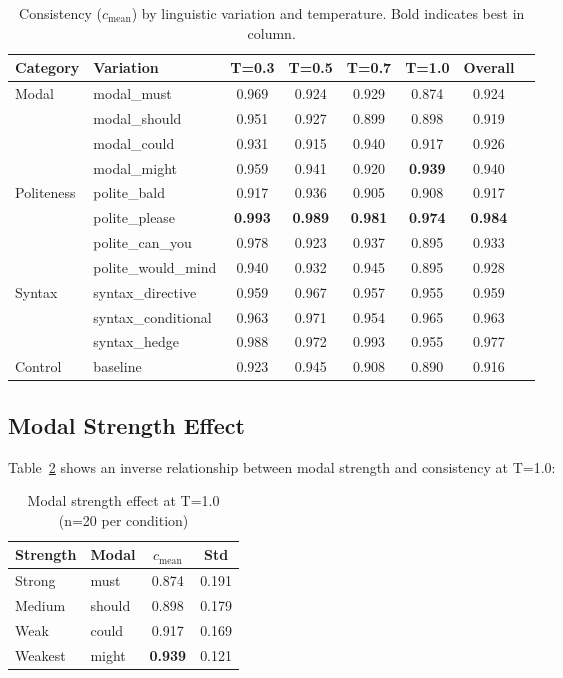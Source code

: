 \documentclass[11pt]{article}
\begin{document}
\begin{table}[t]
\centering
\begin{tabular}{llcccccc}
\toprule
Category & Variation & T=0.3 & T=0.5 & T=0.7 & T=1.0 & Overall \\
\midrule
\multirow{4}{*}{Modal}
& modal\_must & 0.969 & 0.924 & 0.929 & 0.874 & 0.924 \\
& modal\_should & 0.951 & 0.927 & 0.899 & 0.898 & 0.919 \\
& modal\_could & 0.931 & 0.915 & 0.940 & 0.917 & 0.926 \\
& modal\_might & 0.959 & 0.941 & 0.920 & \textbf{0.939} & 0.940 \\
\midrule
\multirow{4}{*}{Politeness}
& polite\_bald & 0.917 & 0.936 & 0.905 & 0.908 & 0.917 \\
& polite\_please & \textbf{0.993} & \textbf{0.989} & \textbf{0.981} & \textbf{0.974} & \textbf{0.984} \\
& polite\_can\_you & 0.978 & 0.923 & 0.937 & 0.895 & 0.933 \\
& polite\_would\_mind & 0.940 & 0.932 & 0.945 & 0.895 & 0.928 \\
\midrule
\multirow{3}{*}{Syntax}
& syntax\_directive & 0.959 & 0.967 & 0.957 & 0.955 & 0.959 \\
& syntax\_conditional & 0.963 & 0.971 & 0.954 & 0.965 & 0.963 \\
& syntax\_hedge & 0.988 & 0.972 & 0.993 & 0.955 & 0.977 \\
\midrule
Control & baseline & 0.923 & 0.945 & 0.908 & 0.890 & 0.916 \\
\bottomrule
\end{tabular}
\caption{Consistency ($c_{\text{mean}}$) by linguistic variation and temperature. Bold indicates best in column.}
\label{tab:variations}
\end{table}

\subsection{Modal Strength Effect}

Table~\ref{tab:modal} shows an inverse relationship between modal strength and consistency at T=1.0:

\begin{table}[h]
\centering
\begin{tabular}{llcc}
\toprule
Strength & Modal & $c_{\text{mean}}$ & Std \\
\midrule
Strong & must & 0.874 & 0.191 \\
Medium & should & 0.898 & 0.179 \\
Weak & could & 0.917 & 0.169 \\
Weakest & might & \textbf{0.939} & 0.121 \\
\bottomrule
\end{tabular}
\caption{Modal strength effect at T=1.0 (n=20 per condition)}
\label{tab:modal}
\end{table}
\end{document}
